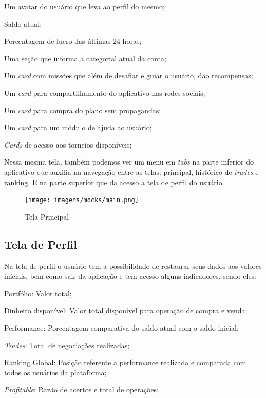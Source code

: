 \begin{lista}
  \item Um avatar do usuário que leva ao perfil do mesmo;
  \item Saldo atual;
  \item Porcentagem de lucro das últimas 24 horas;
  \item Uma seção que informa a categorial atual da conta;
  \item Um \textit{card} com missões que além de desafiar e guiar o usuário, dão recompensas;
  \item Um \textit{card} para compartilhamento do aplicativo nas redes sociais;
  \item Um \textit{card} para compra do plano sem propagandas;
  \item Um \textit{card} para um módulo de ajuda ao usuário;
  \item \textit{Cards} de acesso aos torneios disponíveis;
\end{lista}

Nessa mesma tela, também podemos ver um menu em \textit{tabs} na parte inferior do aplicativo que auxilia na navegação entre as telas: principal, histórico de \textit{trades} e ranking. E na parte superior que da acesso a tela de perfil do usuário.

\begin{figure}[H]
  \caption{\label{fig:mock_login}Tela Principal}
  \centering
  \texttt{[image: imagens/mocks/main.png]}
\end{figure}

\subsection{Tela de Perfil}
Na tela de perfil o usuário tem a possibilidade de restaurar seus dados aos valores iniciais, bem como sair da aplicação e tem acesso alguns indicadores, sendo eles:

\begin{lista}
  \item Portfólio: Valor total;
  \item Dinheiro disponível: Valor total disponível para operação de compra e venda;
  \item Performance: Porcentagem comparativa do saldo atual com o saldo inicial;
  \item \textit{Trades}: Total de negociações realizadas;
  \item Ranking Global: Posição referente a performance realizada e comparada com todos os usuários da plataforma;
  \item \textit{Profitable}: Razão de acertos e total de operações;
\end{lista}

